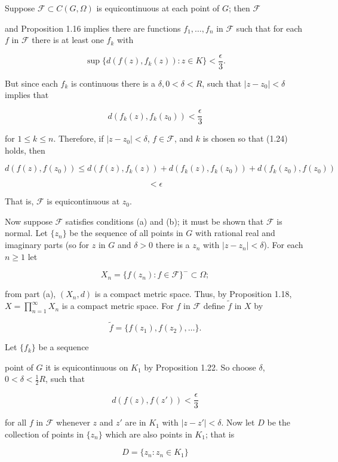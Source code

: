 Suppose $\mathcal{F} \subset C(G, \Omega)$ is equicontinuous at each point of $G$; then $\mathcal{F}$

and Proposition 1.16 implies there are functions $f_1, \ldots, f_n$ in $\mathcal{F}$ such that for each $f$ in $\mathcal{F}$ there is at least one $f_k$ with

$$\sup \{d(f(z), f_k(z)) : z \in K\} < \frac{\epsilon}{3}.$$

But since each $f_k$ is continuous there is a $\delta, 0 < \delta < R$, such that $|z - z_0| < \delta$ implies that

$$d(f_k(z), f_k(z_0)) < \frac{\epsilon}{3}$$

for $1 \leq k \leq n$. Therefore, if $|z - z_0| < \delta$, $f \in \mathcal{F}$, and $k$ is chosen so that (1.24) holds, then

$$d(f(z), f(z_0)) \leq d(f(z), f_k(z)) + d(f_k(z), f_k(z_0)) + d(f_k(z_0), f(z_0))$$

$$< \epsilon$$

That is, $\mathcal{F}$ is equicontinuous at $z_0$.

Now suppose $\mathcal{F}$ satisfies conditions (a) and (b); it must be shown that $\mathcal{F}$ is normal. Let $\{z_n\}$ be the sequence of all points in $G$ with rational real and imaginary parts (so for $z$ in $G$ and $\delta > 0$ there is a $z_n$ with $|z - z_n| < \delta$). For each $n \geq 1$ let

$$X_n = \{f(z_n) : f \in \mathcal{F}\}^- \subset \Omega;$$

from part (a), $(X_n, d)$ is a compact metric space. Thus, by Proposition 1.18, $X = \prod_{n=1}^{\infty} X_n$ is a compact metric space. For $f$ in $\mathcal{F}$ define $\tilde{f}$ in $X$ by

$$\tilde{f} = \{f(z_1), f(z_2), \ldots\}.$$

Let $\{f_k\}$ be a sequence

point of $G$ it is equicontinuous on $K_1$ by Proposition 1.22. So choose $\delta$, $0 < \delta < \frac{1}{2}R$, such that

$$d(f(z), f(z')) < \frac{\epsilon}{3}$$

for all $f$ in $\mathcal{F}$ whenever $z$ and $z'$ are in $K_1$ with $|z - z'| < \delta$. Now let $D$ be the collection of points in $\{z_n\}$ which are also points in $K_1$; that is

$$D = \{z_n : z_n \in K_1\}$$